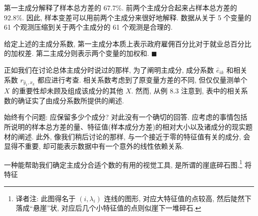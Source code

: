 第一主成分解释了样本总方差的 $67.7\%$. 前两个主成分合起来占样本总方差的 $92.8\%$. 因此, 样本变差可以用前两个主成分来很好地解释. 数据从关于 5 个变量的 61 个观测压缩到关于两个主成分的 61 个观测是合理的.

给定上述的主成分系数, 第一主成分本质上表示政府雇佣百分比对于就业总百分比的加权差. 第二主成分则表示两个变量的加权和. \hfill$\blacksquare$

正如我们在讨论总体主成分时说过的那样, 为了阐明主成分, 成分系数 $\hat{e}_{ik}$ 和相关系数 $r_{\hat{y}_1,x_k}$ 都应进行考查. 相关系数考虑到了原变量方差的不同, 但仅仅量测单个 $X$ 的重要性却未顾及组成该成分的其他 $X$. 然而, 从例 8.3 注意到, 表中的相关系数的确证实了由成分系数所提供的阐述.


始终有个问题: 应保留多少个成分? 对此没有一个确切的回答. 应考虑的事情包括所说明的样本总方差的量、特征值(样本成分方差)的相对大小以及诸成分的现实题材的阐述. 此外, 像我们稍后讨论的那样, 与一个接近于零的特征值有关的成分, 会显得不重要, 却可能表示数据中有一个意外的线性依赖关系.

一种能帮助我们确定主成分合适个数的有用的视觉工具, 是所谓的崖底碎石图.\footnote{{\footnotesize 译者注: 此图得名于 $(i,\lambda_i)$ 连线的图形, 对应大特征值的点较高, 然后陡然下落成“悬崖”状, 对应后几个小特征值的点则似崖下一堆碎石.}} 将特征
